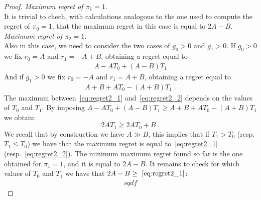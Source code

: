 \begin{proof}
\textit{Maximum regret of $\pi_1=1$}.\\
It is trivial to chech, with calculations analogous to the one used to compute the regret of $\pi_0=1$, that the maximum regret in this case is equal to $2A-B$.\\




\textit{Maximum regret of $\pi_2=1$}.\\
Also in this case, we need to consider the two cases of $g_0 > 0$ and $g_1 > 0$. If $g_0 > 0$ we fix $r_0 = A$ and $r_1 = -A+B$, obtaining a regret equal to 
\begin{align}
A- A T_0 +(A-B) T_1 \label{eq:regret2_1}
\end{align}
And if $g_1 > 0$ we fix $r_0 = -A$ and $r_1 = A+B$, obtaining a regret equal to 
\begin{align}
A+B+A T_0 -(A+B) T_1\;. \label{eq:regret2_2}
\end{align}
The maximum between~\eqref{eq:regret2_1} and~\eqref{eq:regret2_2} depends on the values of $T_0$ and $T_1$.
By imposing  $A- A T_0 +(A-B) T_1 \geq A+B+A T_0 -(A+B) T_1$ we obtain:
$$ 2A T_1 \geq 2 A T_0 + B\;. $$
We recall that by construction we have $A \gg B$, this implies that if $T_1> T_0$ (resp. $T_1\leq T_0$)  we have that the maximum regret is equal to~\eqref{eq:regret2_1} (resp.~\eqref{eq:regret2_2}).
The minimum maximum regret found so far is the one obtained for $\pi_1=1$, and it is equal to $2A-B$. It remains to check for which values of $T_0$ and $T_1$ we have that $2A-B \geq~\eqref{eq:regret2_1}$:
\begin{align*}
sqdf
\end{align*}
 

\end{proof}

